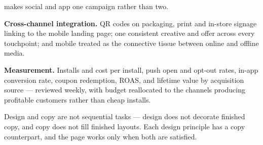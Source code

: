 \begin{qlist}
\begin{apts}
      makes social and app one campaign rather than two.
\item \textbf{Cross-channel integration.} QR codes on packaging, print and
      in-store signage linking to the mobile landing page; one consistent
      creative and offer across every touchpoint; and mobile treated as the
      connective tissue between online and offline media.
\item \textbf{Measurement.} Installs and cost per install, push open and opt-out
      rates, in-app conversion rate, coupon redemption, ROAS, and lifetime value
      by acquisition source --- reviewed weekly, with budget reallocated to the
      channels producing profitable customers rather than cheap installs.
\end{apts}

Design and copy are not sequential tasks --- design does not decorate finished
copy, and copy does not fill finished layouts. Each design principle has a copy
counterpart, and the page works only when both are satisfied.


\end{qlist}
